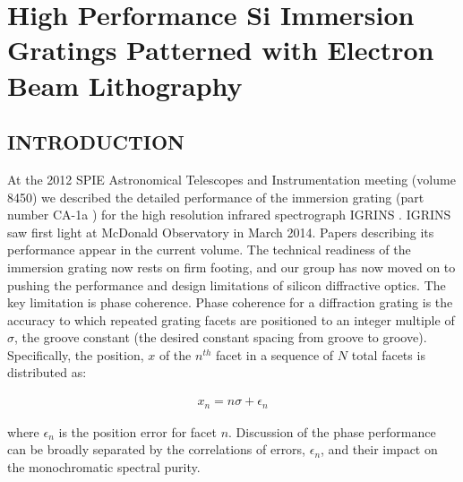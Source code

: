 \chapter{High Performance Si Immersion Gratings Patterned with Electron Beam Lithography} 
\label{chap_ebeam}

\section{INTRODUCTION}
\label{sec:intro}  %

At the 2012 SPIE Astronomical Telescopes and Instrumentation meeting (volume 8450) we described the detailed performance of the immersion grating (part number CA-1a \cite{2012SPIE.8450E..2SG}) for the high resolution infrared spectrograph IGRINS \cite{2010SPIE.7735E..54Y}.  IGRINS saw first light at McDonald Observatory in March 2014.  Papers describing its performance appear in the current volume\cite{2014SPIE.CHANPARK.IGRINS,2014SPIE.9151E..1GB}.  The technical readiness of the immersion grating now rests on firm footing, and our group has now moved on to pushing the performance and design limitations of silicon diffractive optics.  The key limitation is phase coherence.  Phase coherence for a diffraction grating is the accuracy to which repeated grating facets are positioned to an integer multiple of $\sigma$, the groove constant (the desired constant spacing from groove to groove).  Specifically, the position, $x$ of the $n^{th}$ facet in a sequence of $N$ total facets is distributed as: 

\begin{eqnarray}
x_n = n\sigma + \epsilon_n  \label{eqn:Epsilon}
\end{eqnarray}

where $\epsilon_n$ is the position error for facet $n$.  Discussion of the phase performance can be broadly separated by the correlations  of errors, $\epsilon_n$, and their impact on the monochromatic spectral purity.  


